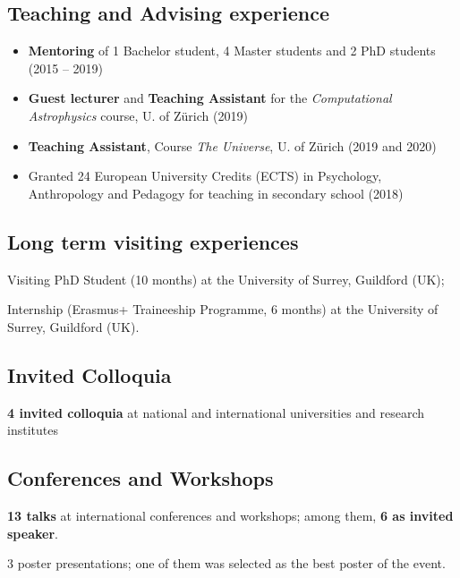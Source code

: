 \subsection*{{Teaching and Advising experience}}
\begin{itemize}[leftmargin=3.5mm]
\setlength\itemsep{-2pt}
\item
\textbf{Mentoring} of 1 Bachelor student, 4 Master students and 2 PhD students (2015 -- 2019)
\item \textbf{Guest lecturer} and \textbf{Teaching Assistant } for the  \textit{Computational Astrophysics} course, U. of Z\"urich (2019)
\item
\textbf{Teaching Assistant}, Course \textit{The Universe}, U. of Z\"urich (2019 and 2020)
\item Granted 24 European University Credits (ECTS)  in Psychology, Anthropology and
Pedagogy for teaching in secondary school (2018)
\end{itemize}


\subsection*{{Long term visiting experiences}}
\begin{description}
\setlength\itemsep{-2pt}
\item[\normalfont 2017:] {Visiting PhD Student} (10 months) at the {University of Surrey}, Guildford (UK);
\item[\normalfont 2015:] {Internship} (Erasmus+ Traineeship Programme, 6 months) at the {University of Surrey}, Guildford (UK).
\end{description}

\subsection*{{Invited Colloquia}}
\begin{description}
\setlength\itemsep{-2pt}
\item[\normalfont 2017 -- 2019:] \textbf{4 invited colloquia} at national and international universities and research institutes
\end{description}


\subsection*{Conferences and Workshops}
\begin{description}
\setlength\itemsep{-2pt}
\item \textbf{13 talks} at international conferences and workshops; among them, \textbf{6 as invited speaker}.
\item 3 poster presentations; one of them was selected as the best poster of the event.
\end{description}


